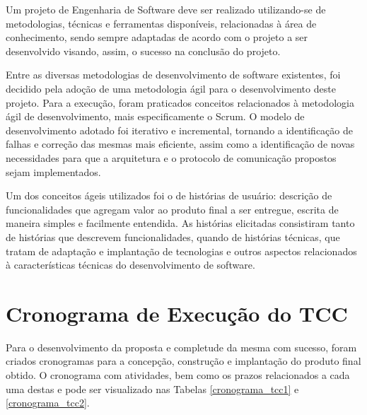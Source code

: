 Um projeto de Engenharia de Software deve ser realizado utilizando-se de metodologias, técnicas e ferramentas disponíveis, relacionadas à área de conhecimento, sendo sempre adaptadas de acordo com o projeto a ser desenvolvido visando, assim, o sucesso na conclusão do projeto.

Entre as diversas metodologias de desenvolvimento de software existentes, foi decidido pela adoção de uma metodologia ágil para o desenvolvimento deste projeto. Para a execução, foram praticados conceitos relacionados à metodologia ágil de desenvolvimento, mais especificamente o Scrum. O modelo de desenvolvimento adotado foi iterativo e incremental, tornando a identificação de falhas e correção das mesmas mais eficiente, assim como a identificação de novas necessidades para que a arquitetura e o protocolo de comunicação propostos sejam implementados.

Um dos conceitos ágeis utilizados foi o de histórias de usuário: descrição de funcionalidades que agregam valor ao produto final a ser entregue, escrita de maneira simples e facilmente entendida. As histórias elicitadas consistiram tanto de histórias que descrevem funcionalidades, quando de histórias técnicas, que tratam de adaptação e implantação de tecnologias e outros aspectos relacionados à características técnicas do desenvolvimento de software.


\section{Cronograma de Execução do TCC}
Para o desenvolvimento da proposta e completude da mesma com sucesso, foram criados cronogramas para a concepção, construção e implantação do produto final obtido. O cronograma com atividades, bem como os prazos relacionados a cada uma destas e pode ser visualizado nas Tabelas \ref{cronograma_tcc1} e \ref{cronograma_tcc2}.

